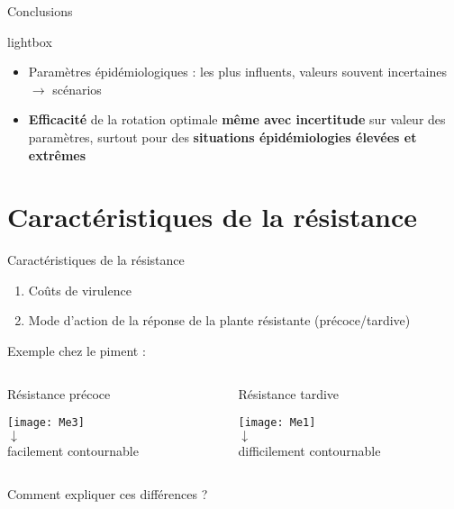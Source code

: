 \begin{frame}{Conclusions}
 \begin{beamercolorbox}[sep=1mm,rounded=true]{lightbox}
  \begin{itemize}[itemsep=3mm]

  \item Paramètres épidémiologiques : les plus influents, valeurs souvent incertaines $\rightarrow$ scénarios
  
  \item \textbf{Efficacité} de la rotation  optimale  \textbf{même avec incertitude} sur valeur des paramètres, surtout pour des \textbf{situations épidémiologies élevées et extrêmes}
 
  \end{itemize}
\end{beamercolorbox}


\end{frame}

\section[Caract. R]{Caractéristiques de la résistance}

\begin{frame}{Caractéristiques de la résistance}


			\begin{enumerate}[itemsep=10pt]
			       \item  Coûts de virulence  
	      \item Mode d'action de la réponse  de la plante résistante (précoce/tardive)



			\end{enumerate}
Exemple chez le piment :\\

 \begin{columns}
 \begin{column}{.52\textwidth} 
\centering

  Résistance précoce

 \texttt{[image: Me3]}\\
 $\downarrow$\\
 	facilement contournable
 \end{column}
 \begin{column}{.55\textwidth} 

\centering
 Résistance tardive
 
 \texttt{[image: Me1]}\\
 	$\downarrow$\\
 	difficilement contournable
 \end{column}
\end{columns}
\begin{center}
\alert{Comment expliquer ces différences ?}

\end{center}
\end{frame}

